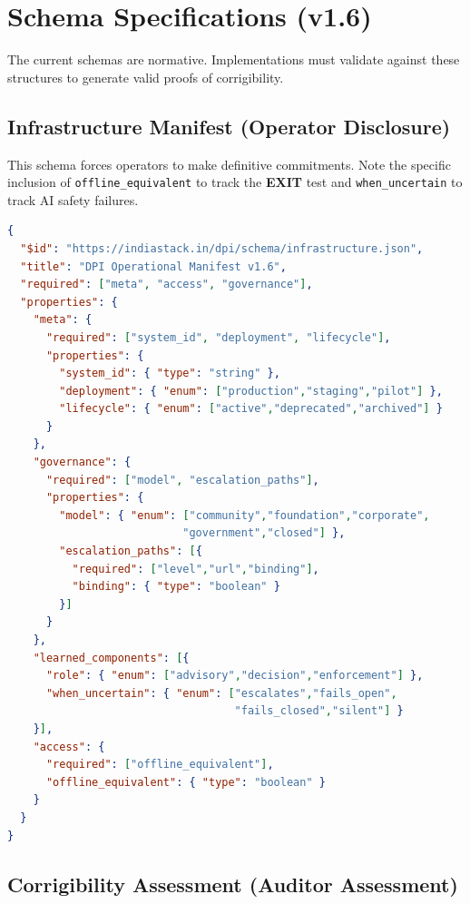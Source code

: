 \documentclass{article}
\begin{document}
\section{Schema Specifications (v1.6)}
\label{appendix:schema}

The current schemas are normative. Implementations must validate against these structures to generate valid proofs of corrigibility.

\subsection{Infrastructure Manifest (Operator Disclosure)}

This schema forces operators to make definitive commitments. Note the specific inclusion of \texttt{offline\_equivalent} to track the \textbf{EXIT} test and \texttt{when\_uncertain} to track AI safety failures.

\begin{lstlisting}[language=json,caption={Operator Disclosure Schema (condensed)}]
{
  "$id": "https://indiastack.in/dpi/schema/infrastructure.json",
  "title": "DPI Operational Manifest v1.6",
  "required": ["meta", "access", "governance"],
  "properties": {
    "meta": {
      "required": ["system_id", "deployment", "lifecycle"],
      "properties": {
        "system_id": { "type": "string" },
        "deployment": { "enum": ["production","staging","pilot"] },
        "lifecycle": { "enum": ["active","deprecated","archived"] }
      }
    },
    "governance": {
      "required": ["model", "escalation_paths"],
      "properties": {
        "model": { "enum": ["community","foundation","corporate",
                           "government","closed"] },
        "escalation_paths": [{
          "required": ["level","url","binding"],
          "binding": { "type": "boolean" }
        }]
      }
    },
    "learned_components": [{
      "role": { "enum": ["advisory","decision","enforcement"] },
      "when_uncertain": { "enum": ["escalates","fails_open",
                                   "fails_closed","silent"] }
    }],
    "access": {
      "required": ["offline_equivalent"],
      "offline_equivalent": { "type": "boolean" }
    }
  }
}
\end{lstlisting}

\subsection{Corrigibility Assessment (Auditor Assessment)}
\end{document}
